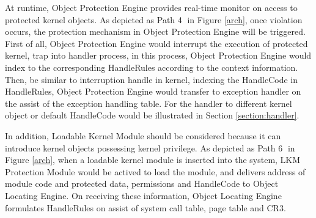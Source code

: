 \documentclass[conference]{IEEEtran}
\begin{document}
At runtime, Object Protection Engine provides real-time monitor on access to protected kernel objects. As depicted as Path \textcircled{4} in Figure \ref{arch}, once violation occurs, the protection mechanism in Object Protection Engine will be triggered. First of all, Object Protection Engine would interrupt the execution of protected kernel, trap into handler process, in this process, Object Protection Engine would index to the corresponding HandleRules according to the context information. Then, be similar to interruption handle in kernel, indexing the HandleCode in HandleRules, Object Protection Engine would transfer to exception handler on the assist of the exception handling table. For the handler to different kernel object or default HandleCode would be illustrated in Section \ref{section:handler}. 


In addition, Loadable Kernel Module should be considered because it can introduce kernel objects possessing kernel privilege. As depicted as Path \textcircled{6} in Figure \ref{arch},  when a loadable kernel module is inserted into the system, LKM Protection Module would be actived to load the module, and delivers address of module code and protected data, permissions and HandleCode to Object Locating Engine. On receiving these information, Object Locating Engine formulates HandleRules on assist of system call table, page table and CR3.


%


\fi


\end{document}
